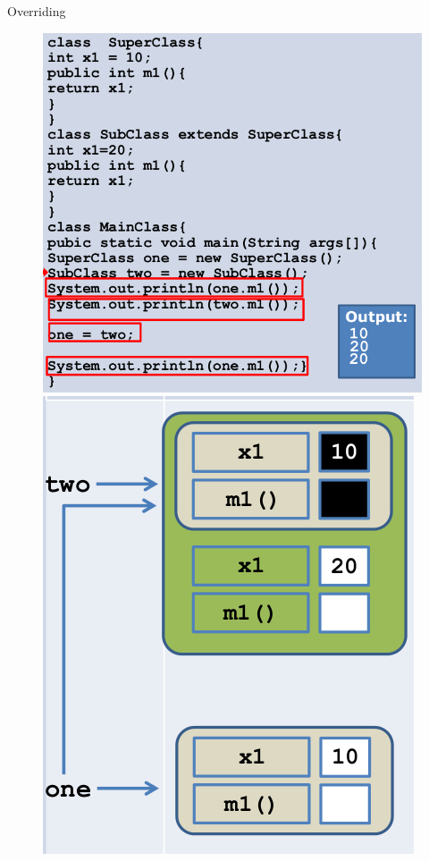 \documentclass[14pt]{beamer}
\begin{document}
\begin{frame}[fragile]{Overriding}
 
 
 \begin{figure}[H]
\begin{minipage}[l]{0.5\linewidth}
\includegraphics[scale=.2]{polyoverride9.png}

\end{minipage}
\quad
\begin{minipage}[c]{0.3\textwidth}
\includegraphics[scale=.2]{polyoverride10.png}

\end{minipage}
\end{figure}
\end{frame}
\end{document}
